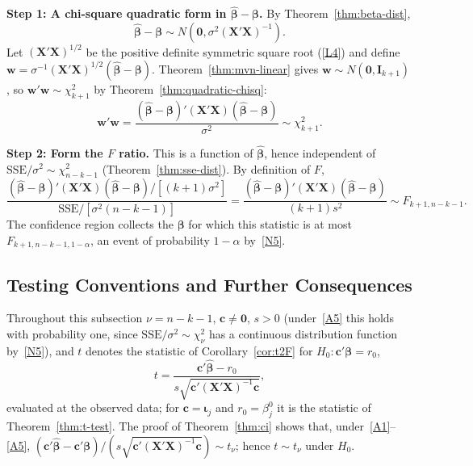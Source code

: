 \documentclass[12pt,a4paper]{article}
\makeatletter
\theoremstyle{definition}
\renewenvironment{proof}[1][\proofname]{\par
  \pushQED{\qed}%
  \normalfont \topsep6\p@\@plus6\p@\relax
  \trivlist
  \item[\hskip\labelsep\bfseries #1\@addpunct{.}]\ignorespaces
}{%
  \popQED\endtrivlist\@endpefalse
}
\newcommand{\SSE}{\mathrm{SSE}}
\newcommand{\bX}{\mathbf{X}}
\def\bb{\boldsymbol{\beta}}
\newcommand{\bI}{\mathbf{I}}
\def\bc{\mathbf{c}}
\newcommand{\bzero}{\mathbf{0}}
\newcommand{\bw}{\mathbf{w}}
\makeatother
\begin{document}
\begin{proof}
\textbf{Step 1: A chi-square quadratic form in $\hat{\bb} - \bb$.} By Theorem~\ref{thm:beta-dist},
\[
\hat{\bb} - \bb \sim N(\bzero, \sigma^2(\bX'\bX)^{-1}).
\]
Let $(\bX'\bX)^{1/2}$ be the positive definite symmetric square root (\ref{L4}) and define $\bw = \sigma^{-1}(\bX'\bX)^{1/2}(\hat{\bb} - \bb)$. Theorem~\ref{thm:mvn-linear} gives $\bw \sim N(\bzero, \bI_{k+1})$, so $\bw'\bw \sim \chi^2_{k+1}$ by Theorem~\ref{thm:quadratic-chisq}:
\[
\bw'\bw = \frac{(\hat{\bb} - \bb)'(\bX'\bX)(\hat{\bb} - \bb)}{\sigma^2} \sim \chi^2_{k+1}.
\]

\textbf{Step 2: Form the $F$ ratio.} This is a function of $\hat{\bb}$, hence independent of $\SSE/\sigma^2 \sim \chi^2_{n-k-1}$ (Theorem~\ref{thm:sse-dist}). By definition of $F$,
\[
\frac{(\hat{\bb} - \bb)'(\bX'\bX)(\hat{\bb} - \bb)/[(k+1)\sigma^2]}{\SSE/[\sigma^2(n-k-1)]} = \frac{(\hat{\bb} - \bb)'(\bX'\bX)(\hat{\bb} - \bb)}{(k+1)s^2} \sim F_{k+1, n-k-1}.
\]
The confidence region collects the $\bb$ for which this statistic is at most $F_{k+1, n-k-1, 1-\alpha}$, an event of probability $1 - \alpha$ by~\ref{N5}.
\end{proof}

\subsection{Testing Conventions and Further Consequences}\label{sec:test-more}

Throughout this subsection $\nu = n - k - 1$, $\bc \neq \bzero$, $s > 0$ (under~\ref{A5} this holds with probability one, since $\SSE/\sigma^2 \sim \chi^2_\nu$ has a continuous distribution function by~\ref{N5}), and $t$ denotes the statistic of Corollary~\ref{cor:t2F} for $H_0\colon \bc'\bb = r_0$,
\[
t = \frac{\bc'\hat{\bb} - r_0}{s\sqrt{\bc'(\bX'\bX)^{-1}\bc}},
\]
evaluated at the observed data; for $\bc = \boldsymbol\iota_j$ and $r_0 = \beta_j^0$ it is the statistic of Theorem~\ref{thm:t-test}. The proof of Theorem~\ref{thm:ci} shows that, under~\ref{A1}--\ref{A5}, $(\bc'\hat{\bb} - \bc'\bb)/(s\sqrt{\bc'(\bX'\bX)^{-1}\bc}) \sim t_\nu$; hence $t \sim t_\nu$ under $H_0$.
\end{document}

